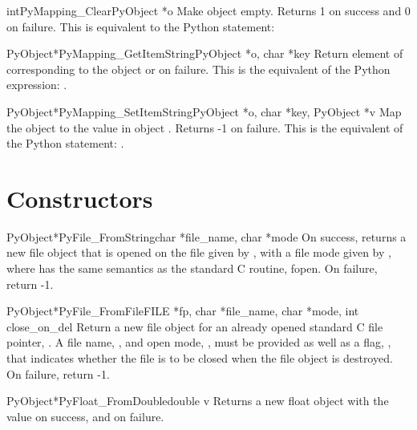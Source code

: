     \begin{cfuncdesc}{int}{PyMapping_Clear}{PyObject *o}
         Make object  empty.  Returns 1 on success and 0 on failure.
	 This is equivalent to the Python statement:
     \end{cfuncdesc}


     \begin{cfuncdesc}{PyObject*}{PyMapping_GetItemString}{PyObject *o, char *key}
	 Return element of  corresponding to the object  or {\NULL}
	 on failure. This is the equivalent of the Python expression:
	 .
     \end{cfuncdesc}

     \begin{cfuncdesc}{PyObject*}{PyMapping_SetItemString}{PyObject *o, char *key, PyObject *v}
         Map the object  to the value  in object .  Returns 
         -1 on failure.  This is the equivalent of the Python
         statement: .
     \end{cfuncdesc}


\section{Constructors}

     \begin{cfuncdesc}{PyObject*}{PyFile_FromString}{char *file_name, char *mode}
	 On success, returns a new file object that is opened on the
	 file given by , with a file mode given by ,
	 where  has the same semantics as the standard C routine,
	 fopen.  On failure, return -1.
     \end{cfuncdesc}
     
     \begin{cfuncdesc}{PyObject*}{PyFile_FromFile}{FILE *fp, char *file_name, char *mode, int close_on_del}
	 Return a new file object for an already opened standard C
	 file pointer, .  A file name, , and open mode,
	 , must be provided as well as a flag, , that
	 indicates whether the file is to be closed when the file
	 object is destroyed.  On failure, return -1.
     \end{cfuncdesc}

     \begin{cfuncdesc}{PyObject*}{PyFloat_FromDouble}{double v}
	 Returns a new float object with the value  on success, and
	 {\NULL} on failure.
     \end{cfuncdesc}
     
